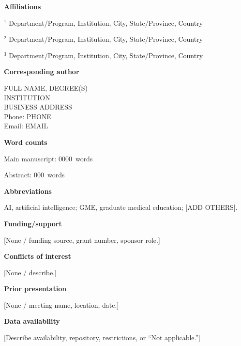 \documentclass[12pt]{article}
\newcommand{\CorrespondingAuthor}{FULL NAME, DEGREE(S)}
\newcommand{\CorrespondingInstitution}{INSTITUTION}
\newcommand{\CorrespondingAddress}{BUSINESS ADDRESS}
\newcommand{\CorrespondingPhone}{PHONE}
\newcommand{\CorrespondingEmail}{EMAIL}
\newcommand{\ManuscriptWordCount}{0000}
\newcommand{\AbstractWordCount}{000}
\begin{document}
\vspace{1em}

\textbf{Affiliations}

$^{1}$ Department/Program, Institution, City, State/Province, Country

$^{2}$ Department/Program, Institution, City, State/Province, Country

$^{3}$ Department/Program, Institution, City, State/Province, Country

\vspace{1em}

\textbf{Corresponding author}

\CorrespondingAuthor\\
\CorrespondingInstitution\\
\CorrespondingAddress\\
Phone: \CorrespondingPhone\\
Email: \CorrespondingEmail

\vspace{1em}

\textbf{Word counts}

Main manuscript: \ManuscriptWordCount\ words

Abstract: \AbstractWordCount\ words

\vspace{1em}

\textbf{Abbreviations}

AI, artificial intelligence; GME, graduate medical education; [ADD OTHERS].

\vspace{1em}

\textbf{Funding/support}

[None / funding source, grant number, sponsor role.]

\vspace{1em}

\textbf{Conflicts of interest}

[None / describe.]

\vspace{1em}

\textbf{Prior presentation}

[None / meeting name, location, date.]

\vspace{1em}

\textbf{Data availability}

[Describe availability, repository, restrictions, or “Not applicable.”]
\end{document}
